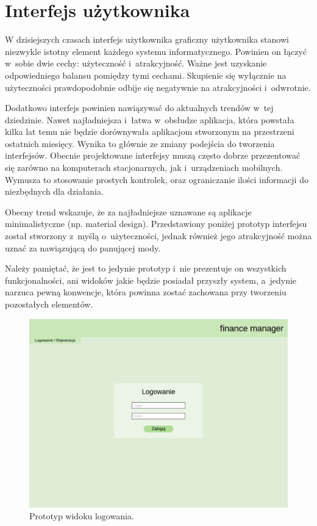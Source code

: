 \section{Interfejs użytkownika}

W dzisiejszych czasach interfejs użytkownika graficzny użytkownika stanowi niezwykle istotny element każdego systemu
informatycznego. Powinien on łączyć w~sobie dwie cechy: użyteczność i~atrakcyjność. Ważne jest uzyskanie odpowiedniego
balansu pomiędzy tymi cechami. Skupienie się wyłącznie na użyteczności prawdopodobnie odbije się negatywnie na
atrakcyjności i~odwrotnie. 

Dodatkowo interfejs powinien nawiązywać do aktualnych trendów w~tej dziedzinie. Nawet najładniejsza i~łatwa w~obsłudze
aplikacja, która powstała kilka lat temu nie będzie dorównywała aplikacjom stworzonym na przestrzeni ostatnich miesięcy.
Wynika to głównie ze zmiany podejścia do tworzenia interfejsów. Obecnie projektowane interfejsy muszą często dobrze
przezentować się zarówno na komputerach stacjonarnych, jak i~urządzeniach mobilnych. Wymusza to stosowanie prostych
kontrolek, oraz ograniczanie ilości informacji do niezbędnych dla działania.

Obecny trend wskazuje, że za najładniejsze uznawane są aplikacje minimalistyczne (np.  material design). Przedstawiony
poniżej prototyp interfejsu został stworzony z~myślą o~użyteczności, jednak również jego atrakcyjność można uznać za
nawiązującą do panującej mody.

Należy pamiętać, że jest to jedynie prototyp i~nie prezentuje on wszystkich funkcjonalności, ani widoków jakie będzie
posiadał przyszły system, a~jedynie narzuca pewną konwencje, która powinna zostać zachowana przy tworzeniu pozostałych
elementów.

\newpage

\begin{figure}[H]
  \centering
  \includegraphics[width=\textwidth]{images/ui-login.png}
  \caption{Prototyp widoku logowania.}
  \label{pic:login}
\end{figure}

